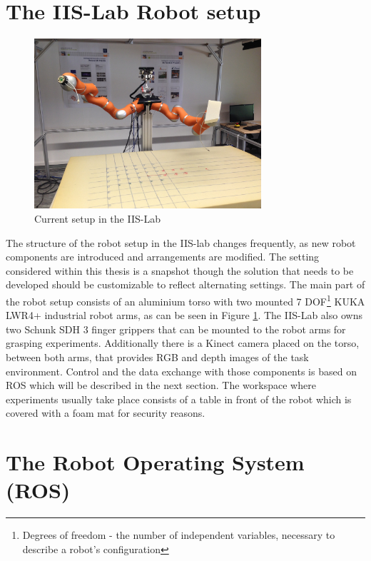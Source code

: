 \section{The IIS-Lab Robot setup}
\begin{figure}[ht]
	\centering
  \includegraphics[width=0.75\textwidth]{images/robot_setup.jpg}
	\caption{Current setup in the IIS-Lab}
	\label{fig:iis_setup}
\end{figure}

The structure of the robot setup in the IIS-lab changes frequently, as new robot components are introduced and arrangements are modified. The setting considered within this thesis is a snapshot though the solution that needs to be developed should be customizable to reflect alternating settings. The main part of the robot setup consists of an aluminium torso with two mounted 7 DOF\footnote{Degrees of freedom - the number of independent variables, necessary to describe a robot's configuration} KUKA LWR4+ industrial robot arms, as can be seen in Figure \ref{fig:iis_setup}. The IIS-Lab also owns two Schunk SDH 3 finger grippers that can be mounted to the robot arms for grasping experiments. Additionally there is a Kinect camera placed on the torso, between both arms, that provides RGB and depth images of the task environment. Control and the data exchange with those components is based on ROS which will be described in the next section. The workspace where experiments usually take place consists of a table in front of the robot which is covered with a foam mat for security reasons. 

\section{The Robot Operating System (ROS)}

